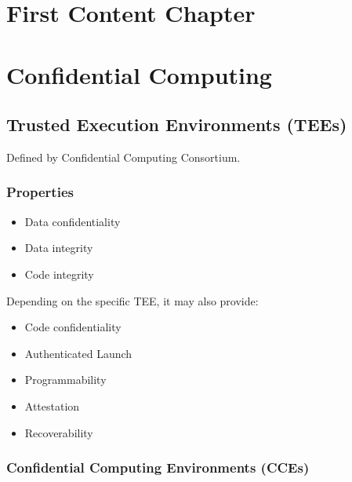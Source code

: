 
\chapter{First Content Chapter}
\label{ch:FirstContent}


\chapter{Confidential Computing}

\section{Trusted Execution Environments (TEEs)}
\label{sec:TEE}

Defined by Confidential Computing Consortium.

\subsection{Properties}

\begin{itemize}
  \item Data confidentiality
  \item Data integrity
  \item Code integrity
\end{itemize}

Depending on the specific TEE, it may also provide:

\begin{itemize}
  \item Code confidentiality
  \item Authenticated Launch
  \item Programmability
  \item Attestation
  \item Recoverability
\end{itemize}

\subsection{Confidential Computing Environments (CCEs)}

